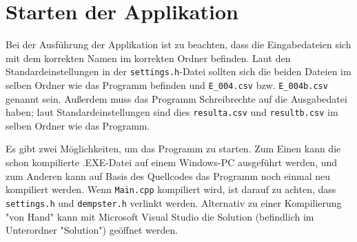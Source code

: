 \chapter{Starten der Applikation}
Bei der Ausführung der Applikation ist zu beachten, dass die Eingabedateien sich mit dem korrekten Namen im korrekten Ordner befinden. Laut den Standardeinstellungen in der \verb|settings.h|-Datei sollten sich die beiden Dateien im selben Ordner wie das Programm befinden und \verb|E_004.csv| bzw. \verb|E_004b.csv| genannt sein. Außerdem muss das Programm Schreibrechte auf die Ausgabedatei haben; laut Standardeinstellungen sind dies \verb|resulta.csv| und \verb|resultb.csv| im selben Ordner wie das Programm.

Es gibt zwei Möglichkeiten, um das Programm zu starten. Zum Einen kann die schon kompilierte .EXE-Datei auf einem Windows-PC ausgeführt werden, und zum Anderen kann auf Basis des Quellcodes das Programm noch einmal neu kompiliert werden. Wenn \verb|Main.cpp| kompiliert wird, ist darauf zu achten, dass \verb|settings.h| und \verb|dempster.h| verlinkt werden. Alternativ zu einer Kompilierung "von Hand" kann mit Microsoft Visual Studio die Solution (befindlich im Unterordner "Solution") geöffnet werden.

